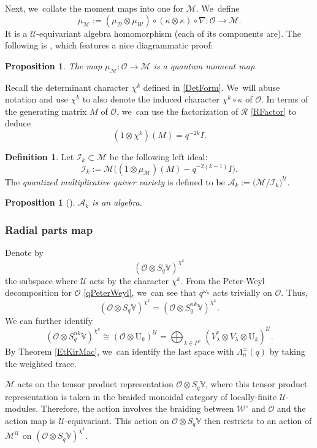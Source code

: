 \documentclass[JEP,XML,SOM,Unicode,published]{cedram}
\newcommand{\rU}{\mathrm{U}}
\newtheorem{prop}[thm]{Proposition}
\theoremstyle{definition}
\newtheorem{defn}[thm]{Definition}
\newcommand{\OO}{\mathcal{O}}
\newcommand{\UU}{\mathcal{U}}
\newcommand{\DD}{\mathcal{D}}
\newcommand{\WW}{\mathcal{W}}
\newcommand{\AAA}{\mathcal{A}}
\newcommand{\WWo}{\WW^\circ}
\newcommand{\MM}{\mathcal{M}}
\begin{document}
Next, we~collate the moment maps into one for $\MM$. We~define
\[
\mu_{\MM}:=(\mu_\DD\otimes\mu_\WW)\circ(\kappa\otimes\kappa)\circ\nabla:\OO\to\MM.
\]
It is a $\UU$-equivariant algebra homomorphism (each of its components are).
The following is \cite[Prop.\,3.10]{GanJorSaf}, which features a nice diagrammatic proof:

\begin{prop}\label{TensorMoment}
The map $\mu_{\MM}:\OO\to\MM$ is a quantum moment map.
\end{prop}

Recall the determinant character $\chi^k$ defined in \eqref{DetForm}. We~will abuse notation and use $\chi^k$ to also denote the induced character $\chi^k\circ\kappa$ of $\OO$.
In terms of the generating matrix $M$ of $\OO$, we~can use the factorization of $\mathcal{R}$ \eqref{RFactor} to deduce
\[
(1\otimes\chi^k)(M)=q^{-2k}I.
\]

\begin{defn}
Let $\mathcal{I}_k\subset\MM$ be the following left ideal:
\[
\mathcal{I}_k:=\MM\bigl((1\otimes\mu_{\MM})(M)-q^{-2(k-1)}I \bigr).
\]
The \textit{quantized multiplicative quiver variety} is defined to be $\AAA_k:=\big(\MM\big/\mathcal{I}_k\big)^\UU$.
\end{defn}

\begin{prop}[\cite{VarVassRoot,GanJorSaf}]\label{RedAlgProp}
$\AAA_k$ is an algebra.
\end{prop}

\subsubsection{Radial parts map}
Denote by
\[
\left(\OO\otimes S_q\mathbb{V} \right)^{\chi^k}
\]
the subspace where $\UU$ acts by the character $\chi^k$.
From the Peter-Weyl decomposition for $\OO$ \eqref{qPeterWeyl}, we~can see that $q^{\omega_n}$ acts trivially on $\OO$.
Thus,
\[
(\OO\otimes S_q\mathbb{V})^{\chi^k}=(\OO\otimes S_q^{nk}\mathbb{V})^{\chi^k}.
\]
We can further identify
\[
(\OO\otimes S_q^{nk}\mathbb{V})^{\chi^k}\cong (\OO\otimes \rU_k)^\UU=\bigoplus_{\lambda\in P^+}(V_\lambda^*\otimes V_\lambda\otimes \rU_k)^{\UU}.
\]
By Theorem \ref{EtKirMac}, we~can identify the last space with $\Lambda_n^\pm(q)$ by taking the weighted trace.

$\MM$ acts on the tensor product representation $\OO\otimes S_q\mathbb{V}$, where this tensor product representation is taken in the braided monoidal category of locally-finite $\UU$-modules.
Therefore, the action involves the braiding between $\WWo$ and $\OO$ and the action map is $\UU$\nobreakdash-equi\-variant.
This action on $\OO\otimes S_q\mathbb{V}$ then restricts to an action of $\MM^\UU$ on $(\OO\otimes S_q\mathbb{V})^{\chi^k}$.
\end{document}
